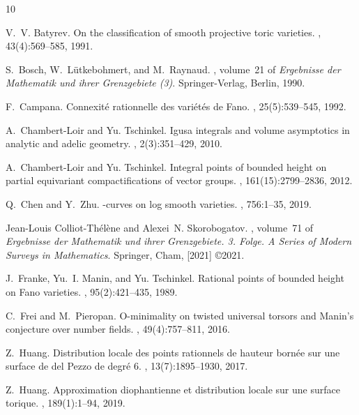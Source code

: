 \documentclass[a4paper, twoside, 11pt]{amsart}
\theoremstyle{definition}
\begin{document}
\begin{thebibliography}{10}
\footnotesize{
V.~V. Batyrev.
\newblock On the classification of smooth projective toric varieties.
, 43(4):569--585, 1991.

S.~Bosch, W.~L\"utkebohmert, and M.~Raynaud.
, volume~21 of {\em Ergebnisse der Mathematik und ihrer Grenzgebiete (3)}.
\newblock Springer-Verlag, Berlin, 1990.

F.~Campana.
\newblock Connexit\'e{} rationnelle des vari\'et\'es de {F}ano.
, 25(5):539--545, 1992.

A.~Chambert-Loir and Yu. Tschinkel.
\newblock Igusa integrals and volume asymptotics in analytic and adelic geometry.
, 2(3):351--429, 2010.

A.~Chambert-Loir and Yu. Tschinkel.
\newblock Integral points of bounded height on partial equivariant compactifications of vector groups.
, 161(15):2799--2836, 2012.

Q.~Chen and Y.~Zhu.
-curves on log smooth varieties.
, 756:1--35, 2019.

Jean-Louis Colliot-Th\'el\`ene and Alexei~N. Skorobogatov.
, volume~71 of {\em Ergebnisse der Mathematik und ihrer Grenzgebiete. 3. Folge. A Series of Modern Surveys in Mathematics}.
\newblock Springer, Cham, [2021] \copyright 2021.

J.~Franke, Yu.~I. Manin, and Yu. Tschinkel.
\newblock Rational points of bounded height on {F}ano varieties.
, 95(2):421--435, 1989.

C.~Frei and M.~Pieropan.
\newblock O-minimality on twisted universal torsors and {M}anin's conjecture over number fields.
, 49(4):757--811, 2016.

Z.~Huang.
\newblock Distribution locale des points rationnels de hauteur born\'ee sur une surface de del {P}ezzo de degr\'e{} 6.
, 13(7):1895--1930, 2017.

Z.~Huang.
\newblock Approximation diophantienne et distribution locale sur une surface torique.
, 189(1):1--94, 2019.

}
\end{thebibliography}
\end{document}
